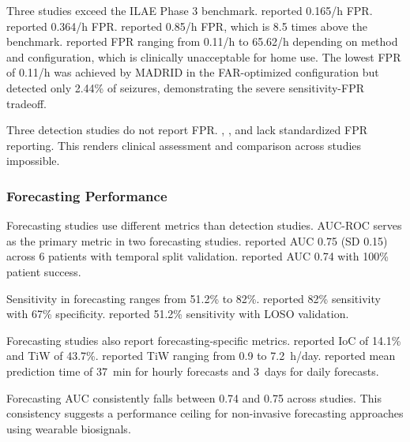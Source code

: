 Three studies exceed the ILAE Phase 3 benchmark. \textcite{dongTwoLayerEnsembleMethod2022} reported 0.165/h FPR. \textcite{wangEpilepticSeizureDetection2025} reported 0.364/h FPR. \textcite{odeDevelopmentEpilepticSeizure2023} reported 0.85/h FPR, which is 8.5 times above the benchmark. \textcite{reintjesECGBasedDetectionEpileptic2025} reported FPR ranging from 0.11/h to 65.62/h depending on method and configuration, which is clinically unacceptable for home use. The lowest FPR of 0.11/h was achieved by MADRID in the FAR-optimized configuration but detected only 2.44\% of seizures, demonstrating the severe sensitivity-FPR tradeoff.

Three detection studies do not report FPR. \textcite{singhrathoreDevelopmentMultimodalMachine2024}, \textcite{elemamAutomatedValidatedTool2025}, and \textcite{borujenyDetectionEpilepticSeizure2013} lack standardized FPR reporting. This renders clinical assessment and comparison across studies impossible.

\subsubsection{Forecasting Performance}

Forecasting studies use different metrics than detection studies. AUC-ROC serves as the primary metric in two forecasting studies. \textcite{nasseriAmbulatorySeizureForecasting2021} reported AUC 0.75 (SD 0.15) across 6 patients with temporal split validation. \textcite{stirlingForecastingSeizureLikelihood2021} reported AUC 0.74 with 100\% patient success.

Sensitivity in forecasting ranges from 51.2\% to 82\%. \textcite{vielufSeizureMonitoringCombined2025} reported 82\% sensitivity with 67\% specificity. \textcite{meiselMachineLearningWristband2020} reported 51.2\% sensitivity with LOSO validation.

Forecasting studies also report forecasting-specific metrics. \textcite{meiselMachineLearningWristband2020} reported IoC of 14.1\% and TiW of 43.7\%. \textcite{nasseriAmbulatorySeizureForecasting2021} reported TiW ranging from 0.9 to 7.2~h/day. \textcite{stirlingForecastingSeizureLikelihood2021} reported mean prediction time of 37~min for hourly forecasts and 3~days for daily forecasts.

Forecasting AUC consistently falls between 0.74 and 0.75 across studies. This consistency suggests a performance ceiling for non-invasive forecasting approaches using wearable biosignals.
